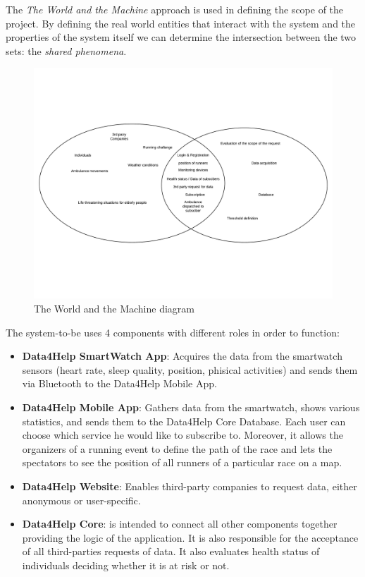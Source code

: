 
The \textit{The World and the Machine} approach is used in defining the scope of the project.
By defining the real world entities that interact with the system and the properties of the system itself we can determine the intersection between the two sets: the \textit{shared phenomena}.

\begin{figure}[H]
	\includegraphics[width=\textwidth,height=\textheight,keepaspectratio]{assets/twatm.pdf}
	\caption{The World and the Machine diagram}
	\label{fig:TWATM}
\end{figure}

The system-to-be uses 4 components with different roles in order to function:
\begin{itemize}
    \item \textbf{Data4Help SmartWatch App}: Acquires the data from the smartwatch sensors (heart rate, sleep quality, position, phisical activities) and sends them via Bluetooth to the Data4Help Mobile App.
    \item \textbf{Data4Help Mobile App}: Gathers data from the smartwatch, shows various statistics, and sends them to the Data4Help Core Database. Each user can choose which service he would like to subscribe to.
    Moreover, it allows the organizers of a running event to define the path of the race and lets the spectators to see the position of all runners of a particular race on a map.
    \item \textbf{Data4Help Website}: Enables third-party companies to request data, either anonymous or user-specific.
    \item \textbf{Data4Help Core}: is intended to connect all other components together providing the logic of the application. It is also responsible for the acceptance of all third-parties requests of data. It also evaluates health status of individuals deciding whether it is at risk or not.
\end{itemize}

